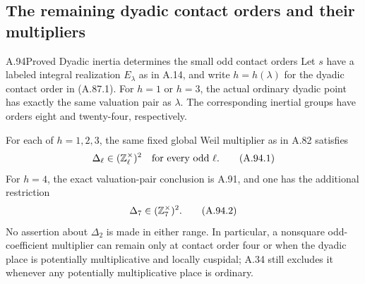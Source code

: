 \subsection{The remaining dyadic contact orders and their multipliers}

\begin{statement}{A.94}{Proved}
{Dyadic inertia determines the small odd contact orders}
Let $s$ have a labeled integral realization $E_\lambda$ as
in A.14, and write $h=h(\lambda)$ for the dyadic contact
order in (A.87.1).
For $h=1$ or $h=3$, the actual ordinary dyadic point has
exactly the same valuation pair as $\lambda$.
The corresponding inertial groups have orders eight
and twenty-four, respectively.

For each of $h=1,2,3$, the same fixed global Weil
multiplier as in A.82 satisfies
\[
                    \Delta_\ell\in(\mathbb Z_\ell^\times)^2
                                  \quad\text{for every odd }\ell.
\tag{A.94.1}
\]
For $h=4$, the exact valuation-pair conclusion is A.91,
and one has the additional restriction
\[
                              \Delta_7\in(\mathbb Z_7^\times)^2.
\tag{A.94.2}
\]
No assertion about $\Delta_2$ is made in either range.
In particular, a nonsquare odd-coefficient multiplier
can remain only at contact order four or when the
dyadic place is potentially multiplicative and locally
cuspidal; A.34 still excludes it whenever any
potentially multiplicative place is ordinary.
\end{statement}
